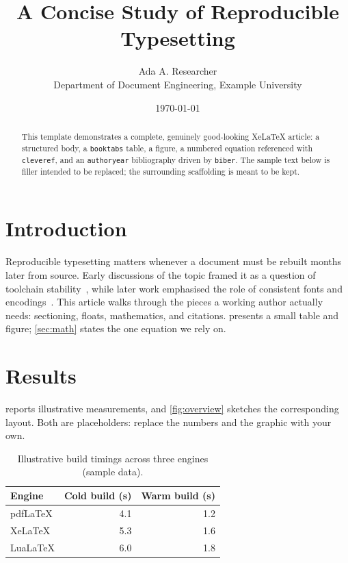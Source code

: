 \documentclass[11pt,a4paper]{article}
\title{A Concise Study of Reproducible Typesetting}
\author{Ada A. Researcher\\\small Department of Document Engineering, Example University}
\date{\today}
\begin{document}
\maketitle

\begin{abstract}
\noindent This template demonstrates a complete, genuinely good-looking
XeLaTeX article: a structured body, a \texttt{booktabs} table, a figure, a
numbered equation referenced with \texttt{cleveref}, and an
\texttt{authoryear} bibliography driven by \texttt{biber}. The sample text
below is filler intended to be replaced; the surrounding scaffolding is meant
to be kept.
\end{abstract}

\section{Introduction}\label{sec:intro}
Reproducible typesetting matters whenever a document must be rebuilt months
later from source. Early discussions of the topic framed it as a question of
toolchain stability~\autocite{lamport1994latex}, while later work emphasised
the role of consistent fonts and encodings~\autocite{robertson2023fontspec}.
This article walks through the pieces a working author actually needs:
sectioning, floats, mathematics, and citations.  presents a
small table and figure; \cref{sec:math} states the one equation we rely on.

\section{Results}\label{sec:results}
 reports illustrative measurements, and \cref{fig:overview}
sketches the corresponding layout. Both are placeholders: replace the numbers
and the graphic with your own.

\begin{table}[htbp]
  \centering
  \caption{Illustrative build timings across three engines (sample data).}%
  \label{tab:summary}
  \begin{tabular}{lrr}
    \toprule
    Engine    & Cold build (s) & Warm build (s) \\
    \midrule
    pdfLaTeX  & 4.1            & 1.2            \\
    XeLaTeX   & 5.3            & 1.6            \\
    LuaLaTeX  & 6.0            & 1.8            \\
    \bottomrule
  \end{tabular}
\end{table}
\end{document}
